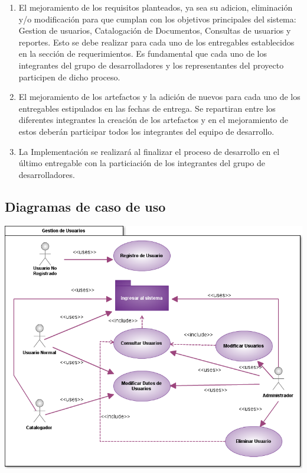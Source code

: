 \documentclass[]{article}
\begin{document}
	\begin{enumerate}
		\item El mejoramiento de los requisitos planteados, ya sea su adicion, eliminación y/o
		modificación para que cumplan con los objetivos principales del sistema: Gestion de
		usuarios, Catalogación de Documentos, Consultas de usuarios y reportes. Esto se debe
		realizar para cada uno de los entregables establecidos en la sección de requerimientos. Es
		fundamental que cada uno de los integrantes del grupo de desarrolladores y los
		representantes del proyecto participen de dicho proceso.

		\item El mejoramiento de los artefactos y la adición de nuevos para cada uno de los
		entregables estipulados en las fechas de entrega. Se repartiran entre los diferentes
		integrantes la creación de los artefactos y en el mejoramiento de estos deberán participar
		todos los integrantes del equipo de desarrollo.

		\item La Implementación se realizará al finalizar el proceso de desarrollo en el último
		entregable con la particiación de los integrantes del grupo de desarrolladores.
	\end{enumerate}

	
	\subsection{Diagramas de caso de uso}
	
	\begin{minipage}[c]{1\linewidth}
		\centering
		\includegraphics[scale=.6]{casosUso/CU_GestionUsuarios}
	\end{minipage}	
	
\end{document}
